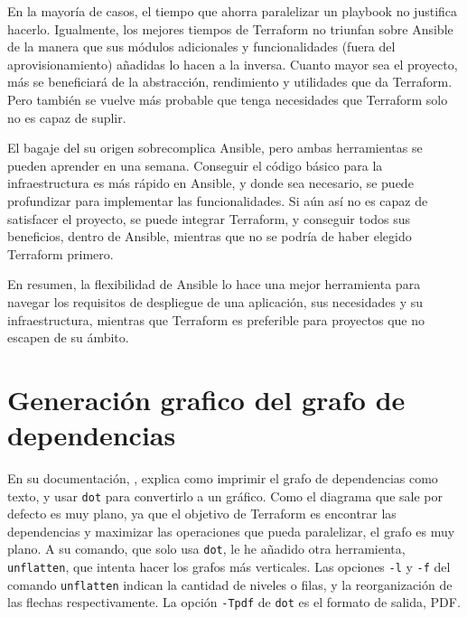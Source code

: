 \documentclass[11pt]{article}
\begin{document}
\begin{flushleft}
En la mayoría de casos, el tiempo que ahorra paralelizar un playbook no justifica hacerlo. Igualmente, los mejores tiempos de Terraform no triunfan sobre Ansible de la manera que sus módulos adicionales y funcionalidades (fuera del aprovisionamiento) añadidas lo hacen a la inversa. Cuanto mayor sea el proyecto, más se beneficiará de la abstracción, rendimiento y utilidades que da Terraform. Pero también se vuelve más probable que tenga necesidades que Terraform solo no es capaz de suplir. 
\linebreak

El bagaje del su origen sobrecomplica Ansible, pero ambas herramientas se pueden aprender en una semana. Conseguir el código básico para la infraestructura es más rápido en Ansible, y donde sea necesario, se puede profundizar para implementar las funcionalidades. Si aún así no es capaz de satisfacer el proyecto, se puede integrar Terraform, y conseguir todos sus beneficios, dentro de Ansible, mientras que no se podría de haber elegido Terraform primero.
\linebreak

En resumen, la flexibilidad de Ansible lo hace una mejor herramienta para navegar los requisitos de despliegue de una aplicación, sus necesidades y su infraestructura, mientras que Terraform es preferible para proyectos que no escapen de su ámbito.









\clearpage
\appendix
\section{Generación grafico del grafo de dependencias}
\label{anexo:grafico}
En su documentación, \cite{hashicorp_graph}, explica como imprimir el grafo de dependencias como texto, y usar \texttt{dot} para convertirlo a un gráfico. Como el diagrama que sale por defecto es muy plano, ya que el objetivo de Terraform es encontrar las dependencias y maximizar las operaciones que pueda paralelizar, el grafo es muy plano. A su comando, que solo usa \texttt{dot}, le he añadido otra herramienta, \texttt{unflatten}, que intenta hacer los grafos más verticales. Las opciones \texttt{-l} y \texttt{-f} del comando \texttt{unflatten} indican la cantidad de niveles o filas, y la reorganización de las flechas respectivamente. La opción \texttt{-Tpdf} de \texttt{dot} es el formato de salida, PDF.
\linebreak


\end{flushleft}
\end{document}
